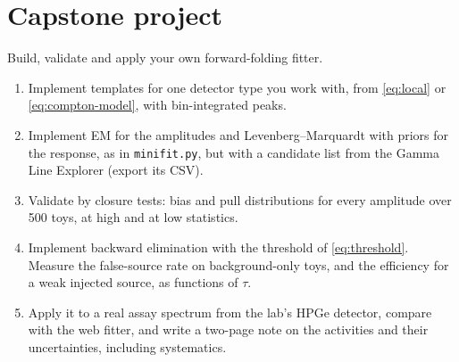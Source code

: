 \documentclass[11pt]{article}
\newcounter{exercise}[section]
\newcommand{\code}[1]{\texttt{#1}}
\begin{document}
\section{Capstone project}\label{sec:capstone}
\begin{exercise}
Build, validate and apply your own forward-folding fitter.
\begin{enumerate}[nosep,label=(\alph*)]
\item Implement templates for one detector type you work with, from \cref{eq:local} or \cref{eq:compton-model}, with bin-integrated peaks.
\item Implement EM for the amplitudes and Levenberg--Marquardt with priors for the response, as in \code{minifit.py}, but with a candidate list from the Gamma Line Explorer (export its CSV).
\item Validate by closure tests: bias and pull distributions for every amplitude over 500 toys, at high and at low statistics.
\item Implement backward elimination with the threshold of \cref{eq:threshold}. Measure the false-source rate on background-only toys, and the efficiency for a weak injected source, as functions of $\tau$.
\item Apply it to a real assay spectrum from the lab's HPGe detector, compare with the web fitter, and write a two-page note on the activities and their uncertainties, including systematics.
\end{enumerate}
\end{exercise}

\appendix
\end{document}
